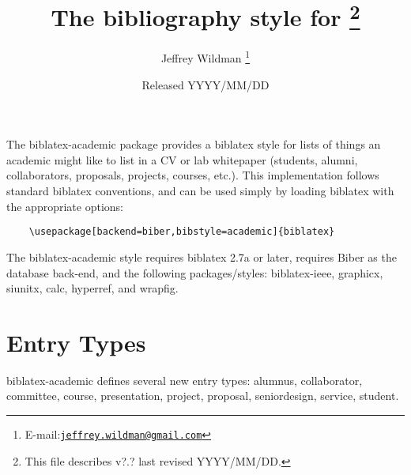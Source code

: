 \documentclass[11pt,letterpaper]{article}
\author{Jeffrey Wildman%
  \thanks{E-mail:\href{mailto:jeffrey.wildman@gmail.com}%
  {\texttt{jeffrey.wildman@gmail.com}}}
}
\title{The \pkg{academic} bibliography style for \pkg{biblatex}%
  \footnote{This file describes v?.? last revised YYYY/MM/DD.}%
}
\date{Released YYYY/MM/DD}
\newcommand{\pkg}[1]{\textsf{#1}}
\newcommand{\entry}[1]{\textsf{#1}}
\begin{document}
\maketitle

The \pkg{biblatex-academic} package provides a \pkg{biblatex} style for lists of things an academic might like to list in a CV or lab whitepaper (students, alumni, collaborators, proposals, projects, courses, etc.).
This implementation follows standard \pkg{biblatex} conventions, and can be used simply by loading \pkg{biblatex} with the appropriate options:
\begin{verbatim}
    \usepackage[backend=biber,bibstyle=academic]{biblatex}
\end{verbatim}
The \pkg{biblatex-academic} style requires \pkg{biblatex} 2.7a or later, requires \pkg{Biber} as the database back-end, and the following packages/styles: \pkg{biblatex-ieee}, \pkg{graphicx}, \pkg{siunitx}, \pkg{calc}, \pkg{hyperref}, and \pkg{wrapfig}.

\section{Entry Types}\label{sec:entry-types}

\pkg{biblatex-academic} defines several new entry types: 
\entry{alumnus}, 
\entry{collaborator}, 
\entry{committee},
\entry{course}, 
\entry{presentation}, 
\entry{project}, 
\entry{proposal}, 
\entry{seniordesign}, 
\entry{service},
\entry{student}. 
\end{document}
